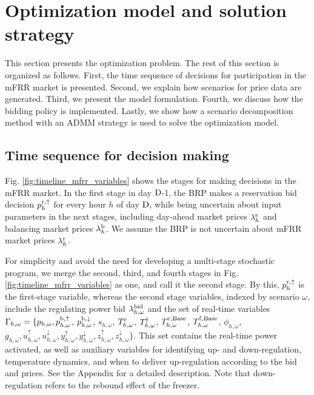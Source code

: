 \section{Optimization model and solution strategy}\label{sec:OptimizationModel}
%
This section presents the optimization problem. The rest of this section is organized as follows. First, the time sequence of decisions for participation in the mFRR market is presented. Second, we explain how scenarios for price data are generated. Third, we present the model formulation. Fourth, we discuss how the bidding policy is implemented. Lastly, we show how a scenario decomposition method with an ADMM strategy is used to solve the optimization model.

\vspace{-1mm}
\subsection{Time sequence for decision making}
Fig. \ref{fig:timeline_mfrr_variables} shows the stages for making decisions in the mFRR market. In the first stage in day $\rm{D}$-1, the BRP makes a reservation bid decision $p_{h}^{\rm{r},\uparrow}$ for every hour $h$ of day $\rm{D}$,  while being uncertain about input parameters in the next stages, including day-ahead market prices $ \lambda_{h}^{\rm{s}}$  and balancing market prices $ \lambda_{h}^{\rm{b}}$. We assume the BRP is not uncertain about mFRR market prices $ \lambda_{h}^{\rm{r}}$. 

For simplicity and avoid the need for developing a multi-stage stochastic program, we merge the second, third, and fourth stages in Fig. \ref{fig:timeline_mfrr_variables} as one, and call it the second stage. By this, $p_{h}^{\rm{r},\uparrow}$ is the first-stage variable, whereas the second stage variables, indexed by scenario $\omega$, include
the regulating power bid $\lambda_{h,\omega}^{\rm{bid}}$ and the set of real-time variables $\Gamma_{h,\omega} = \{ p_{h,\omega}, p_{h,\omega}^{\rm{b},\uparrow}$, $p_{h,\omega}^{\rm{b},\downarrow}$, $s_{h,\omega}$, $T_{h,\omega}^{\rm{c}}$, $T_{h,\omega}^{\rm{f}}$, $T_{h,\omega}^{\rm{c,\text{Base}}}$, $T_{h,\omega}^{\rm{f,\text{Base}}}$, $\phi_{h,\omega}$, $g_{h,\omega}, u^{\uparrow}_{h,\omega}, u^{\downarrow}_{h,\omega}, y^{\uparrow}_{h,\omega}, y^{\downarrow}_{h,\omega}, z^{\uparrow}_{h,\omega}, z^{\downarrow}_{h,\omega} \}$. This set contains the real-time power activated, as well as auxiliary variables for identifying up- and down-regulation,  temperature dynamics, and when to deliver up-regulation according to the bid and prices. See the Appendix for a detailed description. Note that down-regulation refers to the rebound effect of the freezer.

